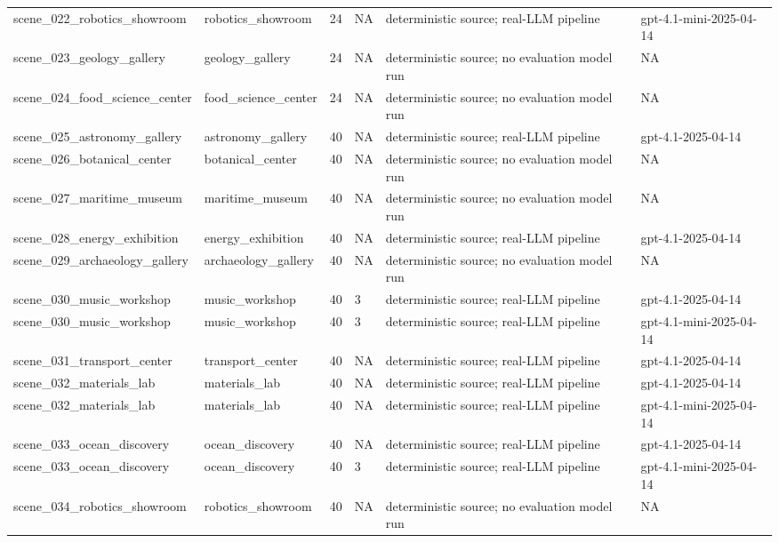 \begin{tabular}{llllll}
scene\_022\_robotics\_showroom & robotics\_showroom & 24 & NA & deterministic source; real-LLM pipeline & gpt-4.1-mini-2025-04-14 \\
scene\_023\_geology\_gallery & geology\_gallery & 24 & NA & deterministic source; no evaluation model run & NA \\
scene\_024\_food\_science\_center & food\_science\_center & 24 & NA & deterministic source; no evaluation model run & NA \\
scene\_025\_astronomy\_gallery & astronomy\_gallery & 40 & NA & deterministic source; real-LLM pipeline & gpt-4.1-2025-04-14 \\
scene\_026\_botanical\_center & botanical\_center & 40 & NA & deterministic source; no evaluation model run & NA \\
scene\_027\_maritime\_museum & maritime\_museum & 40 & NA & deterministic source; no evaluation model run & NA \\
scene\_028\_energy\_exhibition & energy\_exhibition & 40 & NA & deterministic source; real-LLM pipeline & gpt-4.1-2025-04-14 \\
scene\_029\_archaeology\_gallery & archaeology\_gallery & 40 & NA & deterministic source; no evaluation model run & NA \\
scene\_030\_music\_workshop & music\_workshop & 40 & 3 & deterministic source; real-LLM pipeline & gpt-4.1-2025-04-14 \\
scene\_030\_music\_workshop & music\_workshop & 40 & 3 & deterministic source; real-LLM pipeline & gpt-4.1-mini-2025-04-14 \\
scene\_031\_transport\_center & transport\_center & 40 & NA & deterministic source; real-LLM pipeline & gpt-4.1-2025-04-14 \\
scene\_032\_materials\_lab & materials\_lab & 40 & NA & deterministic source; real-LLM pipeline & gpt-4.1-2025-04-14 \\
scene\_032\_materials\_lab & materials\_lab & 40 & NA & deterministic source; real-LLM pipeline & gpt-4.1-mini-2025-04-14 \\
scene\_033\_ocean\_discovery & ocean\_discovery & 40 & NA & deterministic source; real-LLM pipeline & gpt-4.1-2025-04-14 \\
scene\_033\_ocean\_discovery & ocean\_discovery & 40 & 3 & deterministic source; real-LLM pipeline & gpt-4.1-mini-2025-04-14 \\
scene\_034\_robotics\_showroom & robotics\_showroom & 40 & NA & deterministic source; no evaluation model run & NA \\

\end{tabular}
